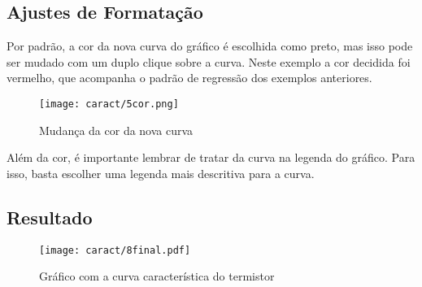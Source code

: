 \subsection{Ajustes de Formatação}

    Por padrão, a cor da nova curva do gráfico é escolhida como preto, mas isso pode ser mudado com um duplo clique sobre a curva. Neste exemplo a cor decidida foi vermelho, que acompanha o padrão de regressão dos exemplos anteriores.

    \begin{figure}[htbp]
        \centering
        \texttt{[image: caract/5cor.png]}

        \caption{Mudança da cor da nova curva}
        \label{fig:caract:cor}
    \end{figure}

    Além da cor, é importante lembrar de tratar da curva na legenda do gráfico. Para isso, basta escolher uma legenda mais descritiva para a curva.

\subsection{Resultado}

    \begin{figure}[htbp]
        \centering
        \texttt{[image: caract/8final.pdf]}

        \caption{Gráfico com a curva característica do termistor}
        \label{fig:caract:final}
    \end{figure}
